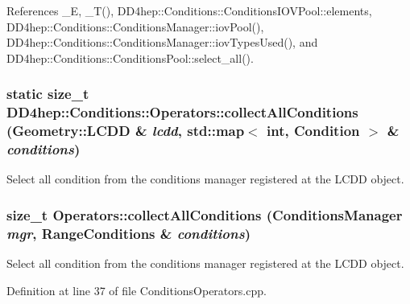 References \_\-E, \_\-T(), DD4hep::Conditions::ConditionsIOVPool::elements, DD4hep::Conditions::ConditionsManager::iovPool(), DD4hep::Conditions::ConditionsManager::iovTypesUsed(), and DD4hep::Conditions::ConditionsPool::select\_\-all().\hypertarget{class_d_d4hep_1_1_conditions_1_1_operators_aaa5374db4d1a9fd0aab1868a95d10672}{
\subsubsection[{collectAllConditions}]{\setlength{\rightskip}{0pt plus 5cm}static size\_\-t DD4hep::Conditions::Operators::collectAllConditions ({\bf Geometry::LCDD} \& {\em lcdd}, \/  std::map$<$ int, {\bf Condition} $>$ \& {\em conditions})}}
\label{class_d_d4hep_1_1_conditions_1_1_operators_aaa5374db4d1a9fd0aab1868a95d10672}


Select all condition from the conditions manager registered at the LCDD object. \hypertarget{class_d_d4hep_1_1_conditions_1_1_operators_a1561bd3845f72fcd583a7bfdc746649c}{
\subsubsection[{collectAllConditions}]{\setlength{\rightskip}{0pt plus 5cm}size\_\-t Operators::collectAllConditions ({\bf ConditionsManager} {\em mgr}, \/  {\bf RangeConditions} \& {\em conditions})}}
\label{class_d_d4hep_1_1_conditions_1_1_operators_a1561bd3845f72fcd583a7bfdc746649c}


Select all condition from the conditions manager registered at the LCDD object. 

Definition at line 37 of file ConditionsOperators.cpp.

